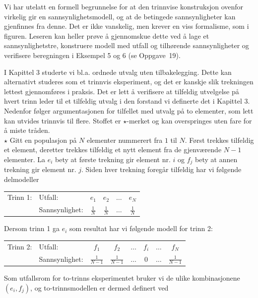 Vi har utelatt en formell begrunnelse for at den trinnvise konstruksjon 
ovenfor virkelig gir en sannsynlighetsmodell, og at de betingede 
sannsynligheter kan gjenfinnes fra denne. Det er ikke vanskelig, men krever
en viss formalisme, som i figuren. Leseren kan heller prøve å 
gjennomskue dette ved å lage et sannsynlighetstre, konstruere modell 
med utfall og tilhørende sannsynligheter og verifisere beregningen  
i Eksempel 5 og 6 (se Oppgave~19). 

I Kapittel 3 studerte vi bl.a. ordnede utvalg uten tilbakelegging.
Dette kan alternativt studeres som et trinn\-vis eksperiment, og det er 
kanskje slik trekningen lettest gjennomføres i praksis. Det er
lett å verifisere at tilfeldig utvelgelse på hvert trinn leder til et
tilfeldig utvalg i den forstand vi definerte det i Kapittel 3.
Nedenfor følger argumentasjonen for tilfellet med utvalg på 
to elementer, som lett kan utvides trinnvis til flere. Stoffet er
$\star$-merket og kan overspringes uten fare for å miste tråden. \\[0.2cm]
\small
$\star$ Gitt en populasjon på $N$ elementer nummerert fra $1$ til $N$.
Først trekkes tilfeldig et element, deretter trekkes tilfeldig et
nytt element fra de gjenværende $N-1$ elementer. La $e_i$ bety at
første trekning gir element nr. $i$ og $f_j$ bety at annen
trekning gir element nr. $j$. Siden hver trekning foregår
tilfeldig har vi følgende delmodeller

\begin{center}
\begin{tabular}{llcccc}
Trinn 1: & Utfall:     & $e_1$&$  e_2 $& $\ldots $ &$ e_N$ \\
         & Sannsynlighet:&$\frac{1}{N}$&$\frac{1}{N}$&$\ldots $&$\frac{1}{N}$ 
\end{tabular}
\end{center}
Dersom trinn 1 ga $e_i$ som resultat har vi følgende modell for
trinn 2:

\begin{center}
\begin{tabular}{llcccccc}
Trinn 2: & Utfall:     & $f_1$&$  f_2 $& $\ldots$ &$f_i$&$\ldots$&$ f_N$ \\
 & Sannsynlighet:&$\frac{1}{N-1}$&$\frac{1}{N-1}$&$\ldots$&$0$&$\ldots$&$\frac{1}{N-1}$ \\
\end{tabular}
\end{center}
Som utfallsrom for to-trinns eksperimentet bruker vi de ulike kombinasjonene $(e_i,f_j)$,
og to-trinnsmodellen er dermed definert ved

